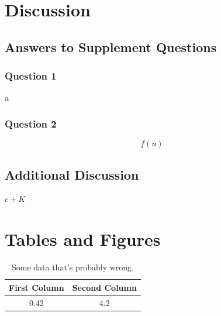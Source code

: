 \documentclass[12pt]{article} %
\begin{document}
\section*{Discussion}
\subsection*{Answers to Supplement Questions}
\subsubsection*{Question 1}
a
\subsubsection*{Question 2}
\begin{equation}
    f(u)
\end{equation}
\subsection*{Additional Discussion}
$c + K$
\section*{Tables and Figures}
\begin{table}[H]
    \centering
    \caption{Some data that's probably wrong.}
    \label{tab:foo}
    \begin{tabular}{ c  c }
        \hline
        \textbf{First Column} & \textbf{Second Column}\\
        \hline
        0.42 & 4.2 \\
        \hline
    \end{tabular}
\end{table}
\end{document}

